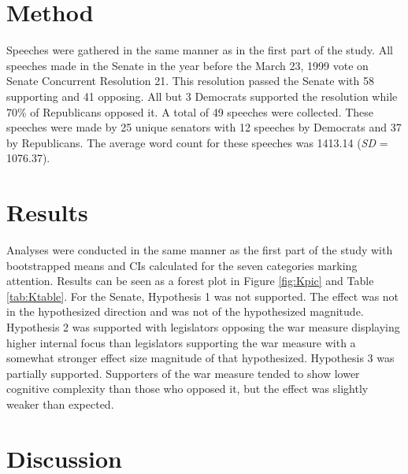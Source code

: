 \documentclass[
  english,
  ,man,floatsintext]{apa6}
\begin{document}
\hypertarget{method-1}{%
\section{Method}\label{method-1}}

Speeches were gathered in the same manner as in the first part of the study. All speeches made in the Senate in the year before the March 23, 1999 vote on Senate Concurrent Resolution 21. This resolution passed the Senate with 58 supporting and 41 opposing. All but 3 Democrats supported the resolution while 70\% of Republicans opposed it. A total of 49 speeches were collected. These speeches were made by 25 unique senators with 12 speeches by Democrats and 37 by Republicans. The average word count for these speeches was 1413.14 (\emph{SD} = 1076.37).

\hypertarget{results-1}{%
\section{Results}\label{results-1}}

Analyses were conducted in the same manner as the first part of the study with bootstrapped means and CIs calculated for the seven categories marking attention. Results can be seen as a forest plot in Figure \ref{fig:Kpic} and Table \ref{tab:Ktable}. For the Senate, Hypothesis 1 was not supported. The effect was not in the hypothesized direction and was not of the hypothesized magnitude. Hypothesis 2 was supported with legislators opposing the war measure displaying higher internal focus than legislators supporting the war measure with a somewhat stronger effect size magnitude of that hypothesized. Hypothesis 3 was partially supported. Supporters of the war measure tended to show lower cognitive complexity than those who opposed it, but the effect was slightly weaker than expected.

\hypertarget{discussion}{%
\section{Discussion}\label{discussion}}
\end{document}
